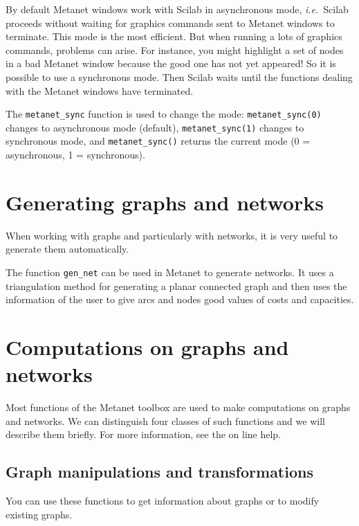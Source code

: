 \documentclass[11pt]{article}
\newcommand{\func}[1]{\texttt{#1}}
\newcommand{\ie}{\hbox{\textit{i.e.}}\ }
\begin{document}
By default Metanet windows work with Scilab in asynchronous mode, 
\ie Scilab
proceeds without waiting for graphics commands sent to Metanet windows to
terminate. This mode is the most efficient. But when running a lots of
graphics commands, problems can arise. For instance, you might
highlight a set of nodes in a bad Metanet window because the good one
has not yet appeared! So it is possible to use a synchronous
mode. 
Then Scilab waits until the functions dealing with the Metanet
windows have terminated. 

The \func{metanet\_sync} function is used to change the mode:
\texttt{metanet\_sync(0)} changes to asynchronous mode (default),
\texttt{metanet\_sync(1)} changes to synchronous mode, and
\texttt{metanet\_sync()} returns the current mode (0 = asynchronous,
1 = synchronous).

\section{Generating graphs and networks}\label{generation}

When working with graphs and particularly with networks, it is very
useful to generate them automatically.

The function \func{gen\_net} can be used in Metanet to generate
networks. It uses a triangulation method for generating a planar
connected graph and then uses the information of the user to give arcs
and nodes good values of costs and capacities.

\section{Computations on graphs and networks}

Most functions of the Metanet toolbox are used to make computations on
graphs and networks. We can distinguish four classes of such functions and
we will describe them briefly. For more information, see the on line
help.

\subsection{Graph manipulations and transformations}

You can use these functions to get information about graphs or to
modify existing graphs.
\end{document}
